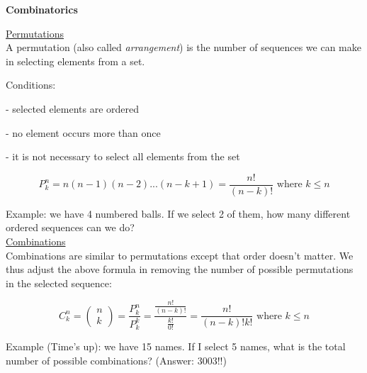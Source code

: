 {\fontsize{12pt}{22pt} \textbf{Combinatorics}\par}

\vspace{5mm}

\underline{Permutations} \\

A permutation (also called \textit{arrangement}) is the number of sequences we can make in selecting elements from a set. 

Conditions:

- selected elements are ordered

- no element occurs more than once

- it is not necessary to select all elements from the set

$$P^n_k = n(n-1)(n-2)...(n-k+1) = \frac{n!}{(n-k)!} \text{ where } k \leq n$$

Example: we have 4 numbered balls. If we select 2 of them, how many different ordered sequences can we do? \\

\underline{Combinations} \\

Combinations are similar to permutations except that order doesn't matter. We thus adjust the above formula in removing the number of possible permutations in the selected sequence:

$$C^n_k = \begin{pmatrix}n \\ k\end{pmatrix} = \frac{P^n_k}{P^k_k} = \frac{\frac{n!}{(n-k)!}}{\frac{k!}{0!}} = \frac{n!}{(n-k)!k!} \text{ where } k \leq n$$

Example (Time's up): we have 15 names. If I select 5 names, what is the total number of possible combinations? (Answer: 3003!!)

\vspace{5mm}